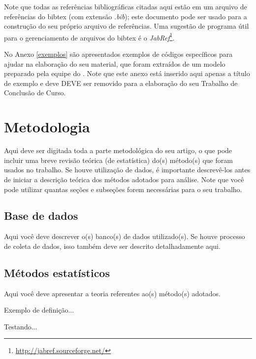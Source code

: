 \documentclass[article,12pt,oneside,a4paper,chapter=TITLE,
			   english,brazil]{abntex2}
\begin{document}
Note que todas as referências bibliográficas citadas aqui estão em um arquivo de referências do \textsf{bibtex} (com extensão \textit{.bib}); este documento pode ser usado para a construção do seu próprio arquivo de referências. Uma sugestão de programa útil para  o gerenciamento de arquivos do \textsf{bibtex} é o \textit{JabRef}\footnote{\url{http://jabref.sourceforge.net/}}.

No Anexo \ref{exemplos} são apresentados exemplos de códigos específicos para ajudar na elaboração do seu material, que foram extraídos de um modelo preparado pela equipe do \abnTeX. Note que este anexo está inserido aqui apenas a título de exemplo e deve DEVE ser removido para a elaboração do seu Trabalho de Conclusão de Curso.

\vspace{\onelineskip}


\chapter{Metodologia}

Aqui deve ser digitada toda a parte metodológica do seu artigo, o que pode incluir uma breve revisão teórica (de estatística) do(s) método(s) que foram usados no trabalho. Se houve utilização de dados, é importante descrevê-los antes de iniciar a descrição teórica dos métodos adotados para análise. Note que você pode utilizar quantas seções e subseções forem necessárias para o seu trabalho.


\section{Base de dados}

Aqui você deve descrever o(s) banco(s) de dados utilizado(s). Se houve processo de coleta de dados, isso também deve ser descrito detalhadamente aqui.


\section{Métodos estatísticos}

Aqui você deve apresentar a teoria referentes ao(s) método(s) adotados.

Exemplo de definição...
\begin{definicao}
	Testando...
\end{definicao}
\end{document}
